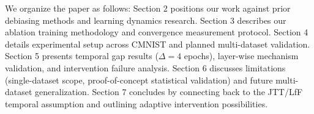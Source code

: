 We organize the paper as follows: Section 2 positions our work against prior debiasing methods and learning dynamics research. Section 3 describes our ablation training methodology and convergence measurement protocol. Section 4 details experimental setup across CMNIST and planned multi-dataset validation. Section 5 presents temporal gap results ($\Delta=4$ epochs), layer-wise mechanism validation, and intervention failure analysis. Section 6 discusses limitations (single-dataset scope, proof-of-concept statistical validation) and future multi-dataset generalization. Section 7 concludes by connecting back to the JTT/LfF temporal assumption and outlining adaptive intervention possibilities.
